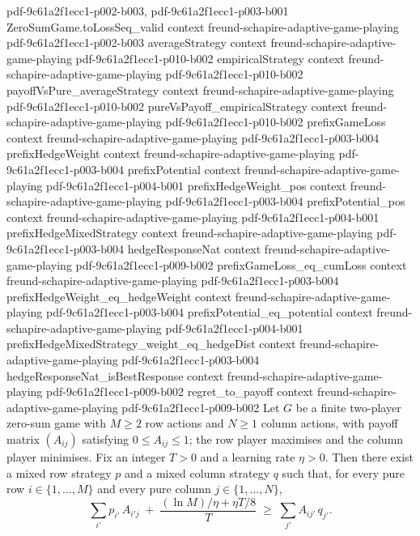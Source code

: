 \begin{lemma}
  {pdf-9c61a2f1ecc1-p002-b003,
    pdf-9c61a2f1ecc1-p003-b001}
\proofstep
  {ZeroSumGame.toLossSeq_valid}
  {context}
  {freund-schapire-adaptive-game-playing}
  {pdf-9c61a2f1ecc1-p002-b003}
\proofstep
  {averageStrategy}
  {context}
  {freund-schapire-adaptive-game-playing}
  {pdf-9c61a2f1ecc1-p010-b002}
\proofstep
  {empiricalStrategy}
  {context}
  {freund-schapire-adaptive-game-playing}
  {pdf-9c61a2f1ecc1-p010-b002}
\proofstep
  {payoffVsPure_averageStrategy}
  {context}
  {freund-schapire-adaptive-game-playing}
  {pdf-9c61a2f1ecc1-p010-b002}
\proofstep
  {pureVsPayoff_empiricalStrategy}
  {context}
  {freund-schapire-adaptive-game-playing}
  {pdf-9c61a2f1ecc1-p010-b002}
\proofstep
  {prefixGameLoss}
  {context}
  {freund-schapire-adaptive-game-playing}
  {pdf-9c61a2f1ecc1-p003-b004}
\proofstep
  {prefixHedgeWeight}
  {context}
  {freund-schapire-adaptive-game-playing}
  {pdf-9c61a2f1ecc1-p003-b004}
\proofstep
  {prefixPotential}
  {context}
  {freund-schapire-adaptive-game-playing}
  {pdf-9c61a2f1ecc1-p004-b001}
\proofstep
  {prefixHedgeWeight_pos}
  {context}
  {freund-schapire-adaptive-game-playing}
  {pdf-9c61a2f1ecc1-p003-b004}
\proofstep
  {prefixPotential_pos}
  {context}
  {freund-schapire-adaptive-game-playing}
  {pdf-9c61a2f1ecc1-p004-b001}
\proofstep
  {prefixHedgeMixedStrategy}
  {context}
  {freund-schapire-adaptive-game-playing}
  {pdf-9c61a2f1ecc1-p003-b004}
\proofstep
  {hedgeResponseNat}
  {context}
  {freund-schapire-adaptive-game-playing}
  {pdf-9c61a2f1ecc1-p009-b002}
\proofstep
  {prefixGameLoss_eq_cumLoss}
  {context}
  {freund-schapire-adaptive-game-playing}
  {pdf-9c61a2f1ecc1-p003-b004}
\proofstep
  {prefixHedgeWeight_eq_hedgeWeight}
  {context}
  {freund-schapire-adaptive-game-playing}
  {pdf-9c61a2f1ecc1-p003-b004}
\proofstep
  {prefixPotential_eq_potential}
  {context}
  {freund-schapire-adaptive-game-playing}
  {pdf-9c61a2f1ecc1-p004-b001}
\proofstep
  {prefixHedgeMixedStrategy_weight_eq_hedgeDist}
  {context}
  {freund-schapire-adaptive-game-playing}
  {pdf-9c61a2f1ecc1-p003-b004}
\proofstep
  {hedgeResponseNat_isBestResponse}
  {context}
  {freund-schapire-adaptive-game-playing}
  {pdf-9c61a2f1ecc1-p009-b002}
\proofstep
  {regret_to_payoff}
  {context}
  {freund-schapire-adaptive-game-playing}
  {pdf-9c61a2f1ecc1-p009-b002}
Let $G$ be a finite two-player zero-sum game with $M \ge 2$ row actions and $N \ge 1$
column actions, with payoff matrix $(A_{ij})$ satisfying $0 \le A_{ij} \le 1$; the row
player maximises and the column player minimises. Fix an integer $T > 0$ and a learning
rate $\eta > 0$. Then there exist a mixed row strategy $p$ and a mixed column strategy
$q$ such that, for every pure row $i \in \{1,\dots,M\}$ and every pure column $j \in
\{1,\dots,N\}$,
\[
  \sum_{i'} p_{i'}\,A_{i'j} \;+\; \frac{(\ln M)/\eta + \eta T/8}{T}
  \;\ge\;
  \sum_{j'} A_{ij'}\,q_{j'}.
\]
\end{lemma}

